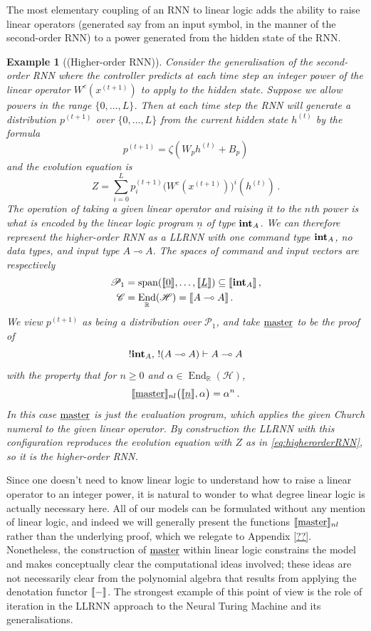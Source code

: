 \documentclass[english,letter paper,12pt,leqno]{article}
\theoremstyle{example}
\newtheorem{example}[theorem]{Example}
\numberwithin{equation}{section}
\def\be{\begin{equation}}
\def\ee{\end{equation}}
\DeclareMathOperator{\End}{End}
\begin{document}
The most elementary coupling of an RNN to linear logic adds the ability to raise linear operators (generated say from an input symbol, in the manner of the second-order RNN) to a power generated from the hidden state of the RNN. 

\begin{example}[(Higher-order RNN)] Consider the generalisation of the second-order RNN where the controller predicts at each time step an integer power of the linear operator $W^c(x^{(t+1)})$ to apply to the hidden state. Suppose we allow powers in the range $\{0,\ldots,L\}$. Then at each time step the RNN will generate a distribution $p^{(t+1)}$ over $\{0,\ldots,L\}$ from the current hidden state $h^{(t)}$ by the formula
\[
p^{(t+1)} = \zeta( W_p h^{(t)} + B_p )
\]
and the evolution equation is
\be\label{eq:higherorderRNN}
Z = \sum_{i=0}^L p_i^{(t+1)} \big( W^c(x^{(t+1)}) \big)^i(h^{(t)})\,.
\ee
The operation of taking a given linear operator and raising it to the $n$th power is what is encoded by the linear logic program $\underline{n}$ of type $\textbf{int}_A$. We can therefore represent the higher-order RNN as a LLRNN with one command type $\textbf{int}_A$, no data types, and input type $A \multimap A$. The spaces of command and input vectors are respectively
\begin{align*}
\mathscr{P}_1 &= \operatorname{span}(\den{\underline{0}}, \ldots, \den{\underline{L}}) \subseteq \den{\inta_A}\,,\\
\mathscr{C} &= \End_{\mathbb{R}}(\mathscr{H}) = \den{A \multimap A}\,.
\end{align*}
We view $p^{(t+1)}$ as being a distribution over $\mathscr{P}_1$, and take $\underline{\textup{master}}$ to be the proof of
\[
{!}\textbf{int}_A, \, {!}(A \multimap A) \vdash A \multimap A
\]
with the property that for $n \ge 0$ and $\alpha \in \End_{\mathbb{R}}(\mathscr{H})$,
\be
\den{\master}_{nl}\big( \den{\underline{n}}, \alpha \big) = \alpha^n\,.
\ee
In this case $\underline{\textup{master}}$ is just the evaluation program, which applies the given Church numeral to the given linear operator. By construction the LLRNN with this configuration reproduces the evolution equation with $Z$ as in \eqref{eq:higherorderRNN}, so it is the higher-order RNN.
\end{example}

Since one doesn't need to know linear logic to understand how to raise a linear operator to an integer power, it is natural to wonder to what degree linear logic is actually necessary here. All of our models can be formulated without any mention of linear logic, and indeed we will generally present the functions $\llbracket \underline{\textup{master}} \rrbracket_{nl}$ rather than the underlying proof, which we relegate to Appendix \ref{??}. Nonetheless, the construction of $\underline{\textup{master}}$ within linear logic constrains the model and makes conceptually clear the computational ideas involved; these ideas are not necessarily clear from the polynomial algebra that results from applying the denotation functor $\llbracket - \rrbracket$. The strongest example of this point of view is the role of iteration in the LLRNN approach to the Neural Turing Machine and its generalisations.
\end{document}
